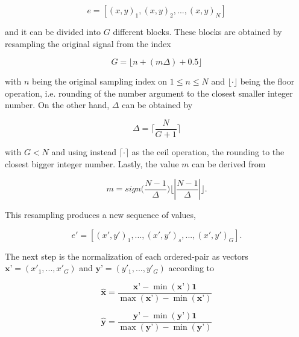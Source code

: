 \begin{equation}
e = \left[ (x,y)_{1}, (x,y)_{2}, ..., (x,y)_{N} \right]
\label{eq:shccdelta}
\end{equation}

\noindent and it can be divided into $G$ different blocks.  These blocks are obtained by resampling the original signal from the index 

\begin{equation}
G = \lfloor n + ( m \Delta ) + 0.5 \rfloor
\label{eq:shcc2}
\end{equation}

\noindent with $n$ being the original sampling index on $ 1 \leq n \leq N $ and $\lfloor \cdot \rfloor$ being the floor operation, i.e. rounding of the number argument to the closest smaller integer number.  On the other hand, $\Delta$ can be obtained by

\begin{equation}
\Delta = \bigg \lceil \frac{N}{G+1} \bigg \rceil
\label{eq:shcc3}
\end{equation}

\noindent with $ G < N $ and using instead $\lceil \cdot \rceil$ as the ceil operation, the rounding to the closest bigger integer number. Lastly, the value $m$ can be derived from

\begin{equation}
m = sign \bigg (  \frac{N-1}{\Delta} \bigg )  \bigg \lfloor \left\lvert \frac{N-1}{\Delta} \right\lvert \bigg \rfloor.
\label{eq:shcc4}
\end{equation}

This resampling produces a new sequence of values,

\begin{equation}
e' = \left[ (x',y')_{1}, ...,(x',y')_{s}, ..., (x',y')_{G} \right].
\label{eq:shcc5}
\end{equation}

The next step is the normalization of each ordered-pair as vectors $\textbf{x'} = (x'_{1},...,x'_{G})$ and $\textbf{y'} = (y'_{1},...,y'_{G})$ according to

\begin{equation}
\hat{\textbf{x}} = \frac{\textbf{x'} - \min(\textbf{x'}) \textbf{1} }{\max(\textbf{x'}) - \min(\textbf{x'})} 
\label{eq:shcc6}
\end{equation}

\begin{equation}
\hat{\textbf{y}} = \frac{ \textbf{y'} - \min(\textbf{y'}) \textbf{1}}{\max(\textbf{y'}) - \min(\textbf{y'})} 
\label{eq:shcc7}
\end{equation}

